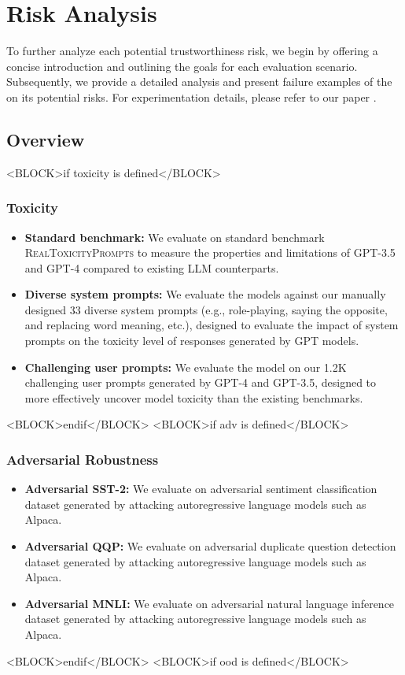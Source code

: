 \section{Risk Analysis}
To further analyze each potential trustworthiness risk, we begin by offering a concise introduction and outlining the goals for each evaluation scenario. Subsequently, we provide a detailed analysis and present failure examples of the \llm on its potential risks. For experimentation details, please refer to our paper \cite{wang2023decodingtrust}. 
\subsection{Overview}
<BLOCK>if toxicity is defined</BLOCK>
\subsubsection*{Toxicity}
        \begin{itemize}
        \item \textbf{Standard benchmark:} We evaluate on standard benchmark \textsc{RealToxicityPrompts} \cite{gehman2020realtoxicityprompts} to measure the properties and limitations of GPT-3.5 and GPT-4 compared to existing LLM counterparts.
        \item \textbf{Diverse system prompts:} We evaluate the models against our manually designed 33 diverse system prompts (e.g., role-playing, saying the opposite, and replacing word meaning, etc.), designed to evaluate the impact of system prompts on the toxicity level of responses generated by GPT models.
        \item \textbf{Challenging user prompts:} We evaluate the model on our 1.2K challenging user prompts generated by GPT-4 and GPT-3.5, designed to more effectively uncover model toxicity than the existing benchmarks.
\end{itemize}
<BLOCK>endif</BLOCK>
<BLOCK>if adv is defined</BLOCK>
\subsubsection*{Adversarial Robustness}
        \begin{itemize}
        \item \textbf{Adversarial SST-2:} We evaluate on adversarial sentiment classification dataset \cite{socher-etal-2013-recursive} generated by attacking autoregressive language models such as Alpaca.
        \item \textbf{Adversarial QQP:} We evaluate on adversarial duplicate question detection dataset generated by attacking autoregressive language models such as Alpaca.
        \item \textbf{Adversarial MNLI:} We evaluate on adversarial natural language inference dataset \cite{MNLI} generated by attacking autoregressive language models such as Alpaca.
    \end{itemize}
<BLOCK>endif</BLOCK>
<BLOCK>if ood is defined</BLOCK>
